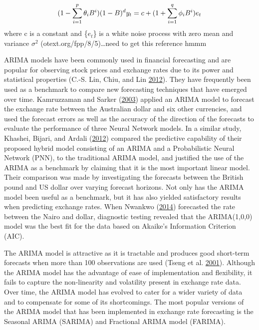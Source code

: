 \documentclass[12pt,preprint, authoryear]{elsarticle}
\numberwithin{equation}{section}
\numberwithin{figure}{section}
\numberwithin{table}{section}
\begin{document}
\[ 
    (1-\sum_{i = 1}^{p} \theta_{i} B^i)(1-B)^dy_t = c + (1 + \sum_{i = 1}^{q} \phi_{i} B^i)e_t \label{eq2} \\ \notag 
\] where c is a constant and \{\(e_t\)\} is a white noise process with
zero mean and variance \(\sigma^2\) (otext.org/fpp/8/5)\ldots{}need to
get this reference hmmm

ARIMA models have been commonly used in financial forecasting and are
popular for observing stock prices and exchange rates due to its power
and statistical properties (C.-S. Lin, Chiu, and Lin
\protect\hyperlink{ref-lin2012}{2012}). They have frequently been used
as a benchmark to compare new forecasting techniques that have emerged
over time. Kamruzzaman and Sarker
(\protect\hyperlink{ref-kamruzzaman2003}{2003}) applied an ARIMA model
to forecast the exchange rate between the Australian dollar and six
other currencies, and used the forecast errors as well as the accuracy
of the direction of the forecasts to evaluate the performance of three
Neural Network models. In a similar study, Khashei, Bijari, and Ardali
(\protect\hyperlink{ref-khashei2012}{2012}) compared the predictive
capability of their proposed hybrid model consisting of an ARIMA and a
Probabilistic Neural Network (PNN), to the traditional ARIMA model, and
justified the use of the ARIMA as a benchmark by claiming that it is the
most important linear model. Their comparison was made by investigating
the forecasts between the British pound and US dollar over varying
forecast horizons. Not only has the ARIMA model been useful as a
benchmark, but it has also yielded satisfactory results when predicting
exchange rates. When Nwankwo (\protect\hyperlink{ref-nwankwo2014}{2014})
forecasted the rate between the Nairo and dollar, diagnostic testing
revealed that the ARIMA(1,0,0) model was the best fit for the data based
on Akaike's Information Criterion (AIC).

The ARIMA model is attractive as it is tractable and produces good
short-term forecasts when more than 100 observations are used (Tseng et
al. \protect\hyperlink{ref-tseng2001}{2001}). Although the ARIMA model
has the advantage of ease of implementation and flexibility, it fails to
capture the non-linearity and volatility present in exchange rate data.
Over time, the ARIMA model has evolved to cater for a wider variety of
data and to compensate for some of its shortcomings. The most popular
versions of the ARIMA model that has been implemented in exchange rate
forecasting is the Seasonal ARIMA (SARIMA) and Fractional ARIMA model
(FARIMA).
\end{document}

